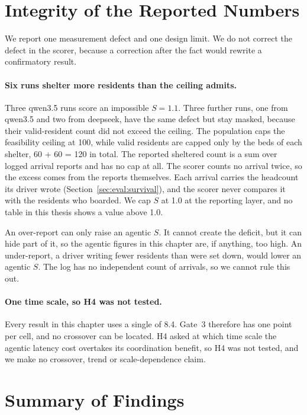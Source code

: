 \section{Integrity of the Reported Numbers}
\label{sec:res:integrity}

We report one measurement defect and one design limit. We do not correct the
defect in the scorer, because a correction after the fact would
rewrite a confirmatory result.

\paragraph{Six runs shelter more residents than the ceiling admits.}
\label{sec:res:integrity:ceiling}
Three qwen3.5 runs score an impossible $S = 1.1$. Three further runs, one from
qwen3.5 and two from deepseek, have the same defect but stay masked, because
their valid-resident count did not exceed the ceiling. The population caps the
feasibility ceiling at 100, while valid residents are capped only by the beds
of each shelter, 60 + 60 = 120 in total. The reported sheltered count is a sum
over logged arrival reports and has no cap at all. The scorer counts no arrival
twice, so the excess comes from the reports themselves. Each arrival
carries the headcount its driver wrote (Section~\ref{sec:eval:survival}), and
the scorer never compares it with the residents who boarded. We cap $S$ at 1.0 at the reporting layer, and no table in this
thesis shows a value above 1.0.

An over-report can only raise an agentic $S$. It cannot create the deficit,
but it can hide part of it, so the agentic figures in this chapter are, if
anything, too high. An under-report, a driver writing fewer residents than
were set down, would lower an agentic $S$. The log has no independent count of
arrivals, so we cannot rule this out.

\paragraph{One time scale, so H4 was not tested.}
\label{sec:res:h4}
Every result in this chapter uses a single  of 8.4. Gate~3
therefore has one point per cell, and no crossover can be located. H4 asked at
which time scale the agentic latency cost overtakes its coordination benefit,
so H4 was not tested, and we make no crossover, trend or scale-dependence
claim.

\section{Summary of Findings}
\label{sec:res:findings}

